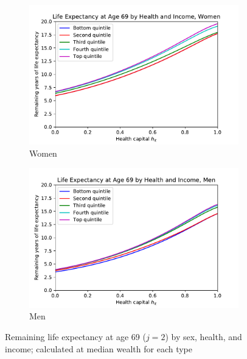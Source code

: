 \documentclass[12pt,pdftex,letterpaper]{article}
\newcommand{\Age}{j}
\begin{document}
\begin{figure}[h!]
    \centering
    \begin{subfigure}[b]{0.49\textwidth}
        \centering
        \includegraphics[width=\textwidth]{../Figures/LifeExpectancyByIncomeWomen.pdf}
        \caption{Women}
    \end{subfigure}
    \begin{subfigure}[b]{0.49\textwidth}
        \centering
        \includegraphics[width=\textwidth]{../Figures/LifeExpectancyByIncomeMen.pdf}
        \caption{Men}
    \end{subfigure}
    \caption{Remaining life expectancy at age 69 ($\Age=2$) by sex, health, and income; calculated at median wealth for each type}
    \label{fig:LifeExpectancy}
\end{figure}



\clearpage
\end{document}
